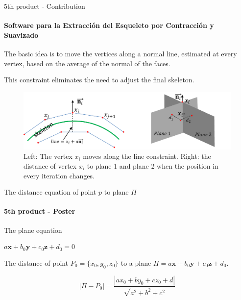 \documentclass[10pt, compress, english]{beamer}
\begin{document}
\begin{frame}{5th product - Contribution}


\framesubtitle{Software para la Extracción del Esqueleto por Contracción y Suavizado}


The basic idea is to move the vertices along a normal line, estimated
at every vertex, based on the average of the normal of the faces. 


This constraint eliminates the need to adjust the final skeleton.


\begin{figure}[H]
\begin{centering}
\includegraphics[width=1\textwidth]{img/LineConstraintSkeleton}
\par\end{centering}

\protect\caption{Left: The vertex $x_{i}$ moves along the line constraint. Right:
the distance of vertex $x_{i}$ to plane 1 and plane 2 when the position
in every iteration changes.}
\end{figure}


\end{frame}

\begin{frame}{The distance equation of point $p$ to plane $\Pi$}


\framesubtitle{5th product - Poster}


The plane equation


\noindent \begin{center}
$a\mathbf{x}+b_{0}\mathbf{y}+c_{0}\mathbf{z}+d_{0}=0$
\par\end{center}


The distance of point $P_{0}=\{x_{0},y_{0},z_{0}\}$ to a plane $\Pi=a\mathbf{x}+b_{0}\mathbf{y}+c_{0}\mathbf{z}+d_{0}$.


\begin{equation}
\left|\Pi-P_{0}\right|=\frac{\left|ax_{0}+by_{0}+cz_{0}+d\right|}{\sqrt{a^{2}+b^{2}+c^{2}}}\label{eq:Plane_distance_equation}
\end{equation}




\end{frame}
\end{document}
